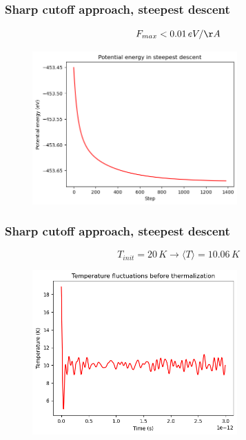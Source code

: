 \documentclass{beamer}
\begin{document}
\begin{frame}
    \frametitle{Sharp cutoff approach, steepest descent}

    $$F_{max}<0.01\,eV/\AA$$

    \begin{figure}
        \includegraphics[width=0.7\textwidth]{images/Usteepest.png}
    \end{figure}

\end{frame}

\begin{frame}
    \frametitle{Sharp cutoff approach, steepest descent}

    $$T_{init}=20\,K \rightarrow \langle T \rangle = 10.06\,K $$

    \begin{figure}
        \includegraphics[width=0.7\textwidth]{images/tempforce.png}
    \end{figure}

\end{frame}
\end{document}

